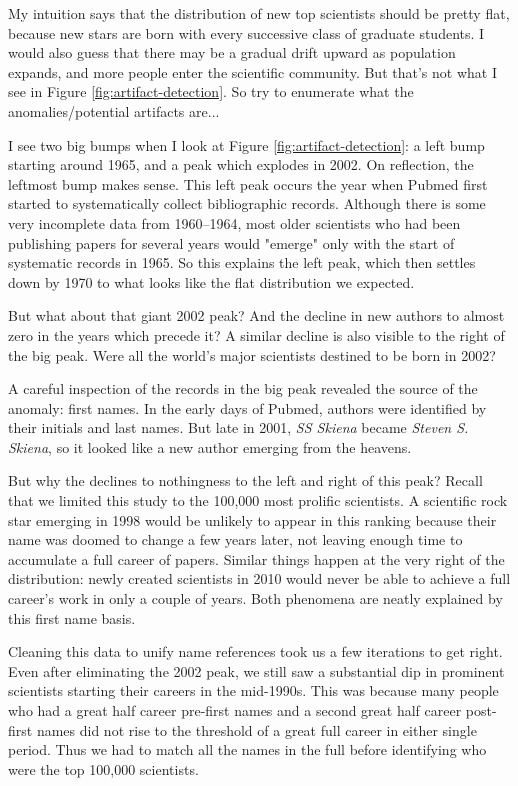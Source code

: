 \documentclass[10pt]{article}
\begin{document}
My intuition says that the distribution of new top scientists should be pretty flat, because new stars are born with every successive class of graduate students. I would also guess that there may be a gradual drift upward as population expands, and more people enter the scientific community. But that's not what I see in Figure \ref{fig:artifact-detection}. So try to enumerate what the anomalies/potential artifacts are...

I see two big bumps when I look at Figure \ref{fig:artifact-detection}: a left bump starting around 1965, and a peak which explodes in 2002. On reflection, the leftmost bump makes sense. This left peak occurs the year when Pubmed first started to systematically collect bibliographic records. Although there is some very incomplete data from 1960–1964, most older scientists who had been publishing papers for several years would "emerge" only with the start of systematic records in 1965. So this explains the left peak, which then settles down by 1970 to what looks like the flat distribution we expected.

But what about that giant 2002 peak? And the decline in new authors to almost zero in the years which precede it? A similar decline is also visible to the right of the big peak. Were all the world's major scientists destined to be born in 2002?

A careful inspection of the records in the big peak revealed the source of the anomaly: first names. In the early days of Pubmed, authors were identified by their initials and last names. But late in 2001, \emph{SS Skiena} became \emph{Steven S. Skiena}, so it looked like a new author emerging from the heavens.

But why the declines to nothingness to the left and right of this peak? Recall that we limited this study to the 100,000 most prolific scientists. A scientific rock star emerging in 1998 would be unlikely to appear in this ranking because their name was doomed to change a few years later, not leaving enough time to accumulate a full career of papers. Similar things happen at the very right of the distribution: newly created scientists in 2010 would never be able to achieve a full career's work in only a couple of years. Both phenomena are neatly explained by this first name basis.

Cleaning this data to unify name references took us a few iterations to get right. Even after eliminating the 2002 peak, we still saw a substantial dip in prominent scientists starting their careers in the mid-1990s. This was because many people who had a great half career pre-first names and a second great half career post-first names did not rise to the threshold of a great full career in either single period. Thus we had to match all the names in the full before identifying who were the top 100,000 scientists.
\end{document}
